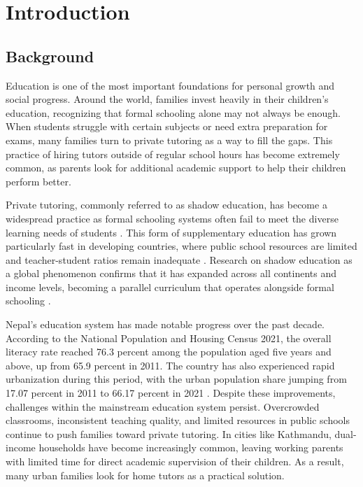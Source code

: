 \documentclass[12pt]{report}
\begin{document}
\newpage

\chapter{Introduction}

\section{Background}

Education is one of the most important foundations for personal
growth and social progress. Around the world, families invest
heavily in their children's education, recognizing that formal
schooling alone may not always be enough. When students struggle
with certain subjects or need extra preparation for exams, many
families turn to private tutoring as a way to fill the gaps.
This practice of hiring tutors outside of regular school hours
has become extremely common, as parents look for additional
academic support to help their children perform better.

Private tutoring, commonly referred to as shadow education, has
become a widespread practice as formal schooling systems often
fail to meet the diverse learning needs of students
\citep{Bray2007Shadow}. This form of supplementary education
has grown particularly fast in developing countries, where
public school resources are limited and teacher-student ratios
remain inadequate \citep{Bray2012Shadow}. Research on shadow
education as a global phenomenon confirms that it has expanded
across all continents and income levels, becoming a parallel
curriculum that operates alongside formal schooling
\citep{Kim2019Shadow}.

Nepal's education system has made notable progress over the past
decade. According to the National Population and Housing Census
2021, the overall literacy rate reached 76.3 percent among the
population aged five years and above, up from 65.9 percent in
2011. The country has also experienced rapid urbanization during
this period, with the urban population share jumping from 17.07
percent in 2011 to 66.17 percent in 2021 \citep{CBS2023}.
Despite these improvements, challenges within the mainstream
education system persist. Overcrowded classrooms, inconsistent
teaching quality, and limited resources in public schools
continue to push families toward private tutoring. In cities
like Kathmandu, dual-income households have become increasingly
common, leaving working parents with limited time for direct
academic supervision of their children. As a result, many urban
families look for home tutors as a practical solution.
\end{document}
